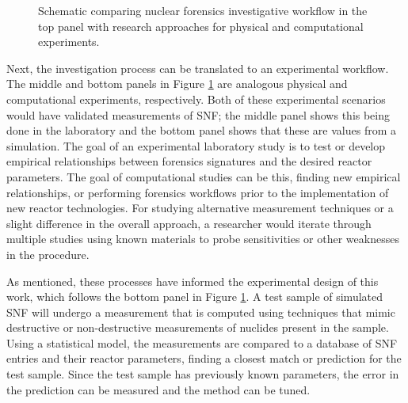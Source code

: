 \begin{figure}[!tbh]
  \caption[Comparison of nuclear forensics workflow against research approaches]
          {Schematic comparing nuclear forensics investigative workflow in the 
          top panel with research approaches for physical and computational 
          experiments.}
  \label{fig:nfworkflows}
\end{figure}

Next, the investigation process can be translated to an experimental workflow.
The middle and bottom panels in Figure \ref{fig:nfworkflows} are analogous
physical and computational experiments, respectively.  Both of these
experimental scenarios would have validated measurements of \gls{SNF}; the
middle panel shows this being done in the laboratory and the bottom panel shows
that these are values from a simulation. The goal of an experimental laboratory
study is to test or develop empirical relationships between forensics
signatures and the desired reactor parameters. The goal of computational
studies can be this, finding new empirical relationships, or performing
forensics workflows prior to the implementation of new reactor technologies.
For studying alternative measurement techniques or a slight difference in the
overall approach, a researcher would iterate through multiple studies using
known materials to probe sensitivities or other weaknesses in the procedure.

As mentioned, these processes have informed the experimental design of this
work, which follows the bottom panel in Figure \ref{fig:nfworkflows}. A test
sample of simulated \gls{SNF} will undergo a measurement that is computed using
techniques that mimic destructive or non-destructive measurements of nuclides
present in the sample.  Using a statistical model, the measurements are
compared to a database of \gls{SNF} entries and their reactor parameters,
finding a closest match or prediction for the test sample. Since the test
sample has previously known parameters, the error in the prediction can be
measured and the method can be tuned. 

